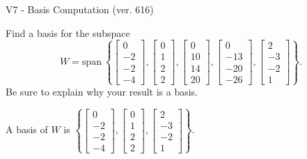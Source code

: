 \begin{exercise}
  \begin{exerciseTitle}V7 - Basis Computation (ver. 616)\end{exerciseTitle}
  \begin{exerciseStatement}
    Find a basis for the subspace 
\[W=\mathrm{span}\ \left\{\left[\begin{array}{r}
0 \\
-2 \\
-2 \\
-4
\end{array}\right] , \left[\begin{array}{r}
0 \\
1 \\
2 \\
2
\end{array}\right] , \left[\begin{array}{r}
0 \\
10 \\
14 \\
20
\end{array}\right] , \left[\begin{array}{r}
0 \\
-13 \\
-20 \\
-26
\end{array}\right] , \left[\begin{array}{r}
2 \\
-3 \\
-2 \\
1
\end{array}\right]\right\}.\]
 Be sure to explain why your result is a basis.


  \end{exerciseStatement}
  \begin{exerciseAnswer}
   A basis of \(W\) is  \(\left\{\left[\begin{array}{r}
0 \\
-2 \\
-2 \\
-4
\end{array}\right] , \left[\begin{array}{r}
0 \\
1 \\
2 \\
2
\end{array}\right] , \left[\begin{array}{r}
2 \\
-3 \\
-2 \\
1
\end{array}\right]\right\}\).
  


  \end{exerciseAnswer}
\end{exercise}